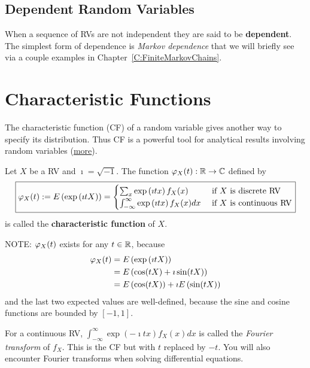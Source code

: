 \subsection{Dependent Random Variables}
When a sequence of RVs are not independent they are said to be {\bf dependent}.  
The simplest form of dependence is {\em Markov dependence} that we will briefly see via a couple examples in Chapter~\ref{C:FiniteMarkovChains}.



\newpage
\section{Characteristic Functions}\label{S:CF}
The characteristic function (CF) of a random variable gives another way to specify its distribution. 
Thus CF is a powerful tool for analytical results involving random variables
(\href{http://en.wikipedia.org/wiki/Characteristic_function_(probability_theory)}{more}).

\begin{definition}
Let $X$ be a RV and $\imath=\sqrt{-1}$. The function $\varphi_X(t) : \mathbb{R} \to \mathbb{C}$ defined by
\begin{equation}\label{E:CF}
\boxed{
\varphi_X(t) := E \left( \exp \left( \imath t X\right) \right) = 
\begin{cases}
\sum_{x} \exp \left( \imath t x\right) f_X(x) & \text{ if $X$ is discrete RV}\\
\int_{-\infty}^{\infty} \exp \left( \imath t x\right) f_X(x) dx & \text{ if $X$ is continuous RV}
\end{cases}
}
\end{equation}
is called the {\bf characteristic function} of $X$.
\end{definition}

NOTE: 
$\varphi_X(t)$ exists for any $t \in \mathbb{R}$, because
\begin{align*}
\varphi_X(t) 
&= E \left( \exp \left( \imath t X\right) \right) \\
&= E \left( \cos(tX)+ \imath \sin(tX) \right)\\
&= E \left( \cos(tX) \right) + \imath E \left(\sin(tX) \right)
\end{align*}
and the last two expected values are well-defined, because the sine and cosine functions are bounded by $[-1,1]$.

For a continuous RV, $\int_{-\infty}^{\infty} \exp \left(- \imath t x\right) f_X(x) dx$ is called the {\em Fourier transform} of $f_X$.  
This is the CF but with $t$ replaced by $-t$.  
You will also encounter Fourier transforms when solving differential equations.

